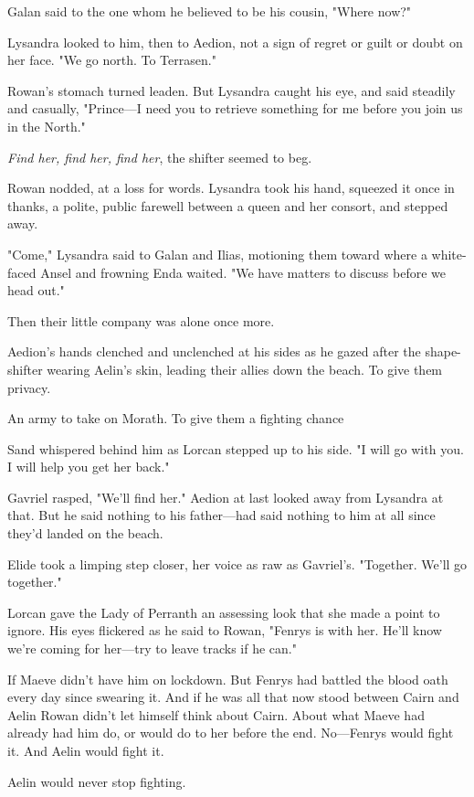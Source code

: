 Galan said to the one whom he believed to be his cousin, "Where now?"

Lysandra looked to him, then to Aedion, not a sign of regret or guilt or doubt on her face. "We go north. To Terrasen."

Rowan's stomach turned leaden. But Lysandra caught his eye, and said steadily and casually, "Prince---I need you to retrieve something for me before you join us in the North."

\emph{Find her, find her, find her}, the shifter seemed to beg.

Rowan nodded, at a loss for words. Lysandra took his hand, squeezed it once in thanks, a polite, public farewell between a queen and her consort, and stepped away.

"Come," Lysandra said to Galan and Ilias, motioning them toward where a white-faced Ansel and frowning Enda waited. "We have matters to discuss before we head out."

Then their little company was alone once more.

Aedion's hands clenched and unclenched at his sides as he gazed after the shape-shifter wearing Aelin's skin, leading their allies down the beach. To give them privacy.

An army to take on Morath. To give them a fighting chance 

Sand whispered behind him as Lorcan stepped up to his side. "I will go with you. I will help you get her back."

Gavriel rasped, "We'll find her." Aedion at last looked away from Lysandra at that. But he said nothing to his father---had said nothing to him at all since they'd landed on the beach.

Elide took a limping step closer, her voice as raw as Gavriel's. "Together. We'll go together."

Lorcan gave the Lady of Perranth an assessing look that she made a point to ignore. His eyes flickered as he said to Rowan, "Fenrys is with her. He'll know we're coming for her---try to leave tracks if he can."

If Maeve didn't have him on lockdown. But Fenrys had battled the blood oath every day since swearing it. And if he was all that now stood between Cairn and Aelin  Rowan didn't let himself think about Cairn. About what Maeve had already had him do, or would do to her before the end. No---Fenrys would fight it. And Aelin would fight it.

Aelin would never stop fighting.

